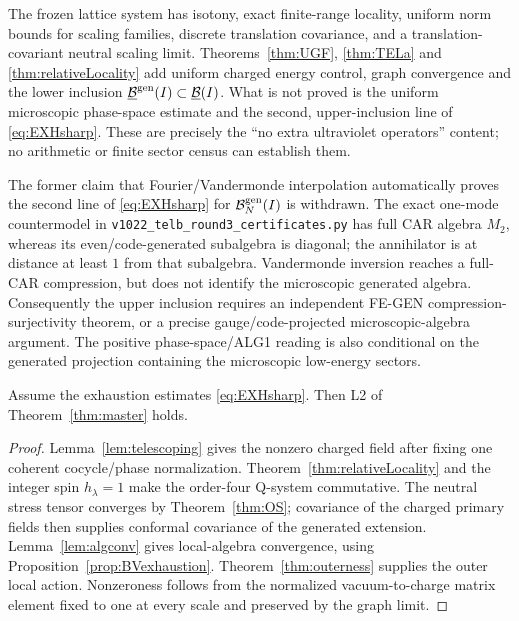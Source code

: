 \begin{remark}
The frozen lattice system has isotony, exact finite-range locality,
uniform norm bounds for scaling families, discrete translation
covariance, and a translation-covariant neutral scaling limit.
Theorems~\ref{thm:UGF}, \ref{thm:TELa} and
\ref{thm:relativeLocality} add uniform charged energy control, graph
convergence and the lower inclusion
$\underline{\mathcal B}^{\rm gen}(I)\subset\underline{\mathcal B}(I)$.  What is not
proved is the uniform microscopic phase-space estimate and the second,
upper-inclusion line of \eqref{eq:EXHsharp}.  These are precisely the
``no extra ultraviolet operators'' content; no arithmetic or finite
sector census can establish them.
\end{remark}

\begin{remark}
The former claim that Fourier/Vandermonde interpolation automatically proves
the second line of \eqref{eq:EXHsharp} for
$\mathcal B_N^{\rm gen}(I)$ is withdrawn.  The exact one-mode countermodel in
\texttt{v1022\_telb\_round3\_certificates.py} has full CAR algebra $M_2$,
whereas its even/code-generated subalgebra is diagonal; the annihilator is at
distance at least $1$ from that subalgebra.  Vandermonde inversion reaches a
full-CAR compression, but does not identify the microscopic generated algebra.
Consequently the upper inclusion requires an independent FE-GEN
compression-surjectivity theorem, or a precise gauge/code-projected
microscopic-algebra argument.  The positive phase-space/ALG1 reading is also
conditional on the generated projection containing the microscopic
low-energy sectors.
\end{remark}

\begin{theorem}\label{thm:L2reduction}
Assume the exhaustion estimates \eqref{eq:EXHsharp}.  Then L2 of
Theorem~\ref{thm:master} holds.
\end{theorem}

\begin{proof}
Lemma~\ref{lem:telescoping} gives the nonzero charged field after fixing
one coherent cocycle/phase normalization.
Theorem~\ref{thm:relativeLocality} and the integer spin $h_\lambda=1$
make the order-four Q-system commutative.
The neutral stress tensor converges by Theorem~\ref{thm:OS}; covariance
of the charged primary fields then supplies conformal covariance of the
generated extension.  Lemma~\ref{lem:algconv} gives local-algebra
convergence, using Proposition~\ref{prop:BVexhaustion}.
Theorem~\ref{thm:outerness} supplies the outer local action.
Nonzeroness follows from the normalized vacuum-to-charge
matrix element fixed to one at every scale and preserved by the graph
limit.
\end{proof}

